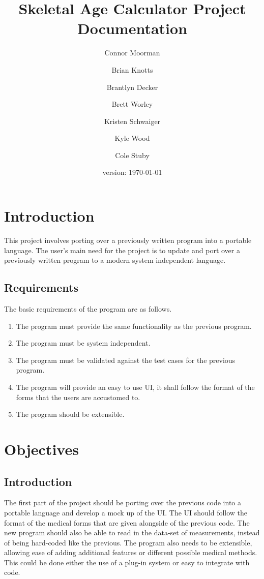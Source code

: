 \documentclass[12pt,letterpaper]{article}
\author{Connor Moorman \and Brian Knotts \and Brantlyn Decker \and Brett Worley \and Kristen Schwaiger \and Kyle Wood \and Cole Stuby}
\title{Skeletal Age Calculator Project Documentation}
\date{version: \today}
\begin{document}
\maketitle
\tableofcontents

\section{Introduction}

This project involves porting over a previously written program into a portable language. The user's main need for the project is to update and port over a previously written program to a modern system independent language. 

\subsection{Requirements}

The basic requirements of the program are as follows.

\begin{enumerate}

\item The program must provide the same functionality as the previous program.
\item The program must be system independent.
\item The program must be validated against the test cases for the previous program.
\item The program will provide an easy to use UI, it shall follow the format of the forms that the users are accustomed to.
\item The program should be extensible.

\end{enumerate}

\section{Objectives}

\subsection{Introduction}

The first part of the project should be porting over the previous code into a portable language and develop a mock up of the UI. The UI should follow the format of the medical forms that are given alongside of the previous code. The new program should also be able to read in the data-set of measurements, instead of being hard-coded like the previous. The program also needs to be extensible, allowing ease of adding additional features or different possible medical methods. This could be done either the use of a plug-in system or easy to integrate with code.
\end{document}
